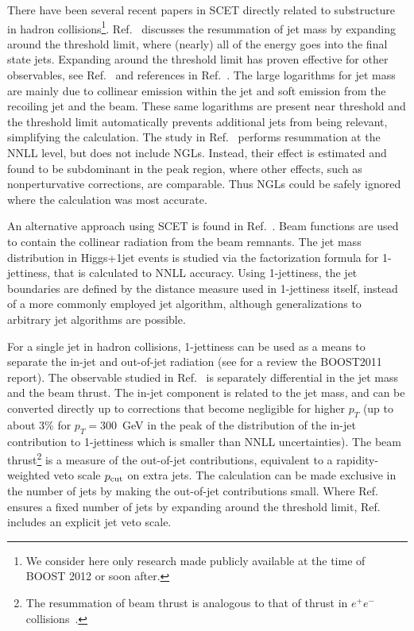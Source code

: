 There have been several recent papers in SCET directly related to 
substructure in hadron collisions\footnote{We consider here only 
research made publicly available at the time of BOOST 2012 or soon after.}. 
Ref.~\cite{Chien:2012ur} discusses the resummation of jet mass by expanding
around the threshold limit, where (nearly) all of the energy goes into the
final state jets. Expanding around the threshold limit has proven effective 
for other observables, see Ref.~\cite{Laenen:1998qw} and references in
Ref.~\cite{Chien:2012ur}.
The large logarithms for jet mass are mainly due
to collinear emission within the jet and soft emission from the recoiling
jet and the beam. These same logarithms are present near threshold and the
threshold limit automatically prevents additional jets from being 
relevant, simplifying the calculation. The study in Ref.~\cite{Chien:2012ur}
performs resummation at the NNLL level, but does not include NGLs. Instead,
their effect is estimated and found to be subdominant in the peak region,
where other effects, such as nonperturvative corrections, are comparable. 
Thus NGLs could be safely ignored where the calculation was most accurate. 

An alternative approach using SCET is found in Ref.~\cite{Jouttenus:2013hs}. 
Beam functions are used to contain the collinear radiation from the beam
remnants. The jet mass distribution 
in Higgs+1jet events is studied via the factorization formula for 1-jettiness, 
that is calculated to NNLL accuracy. Using 1-jettiness, the jet boundaries 
are defined by the distance measure used in 1-jettiness itself, instead of 
a more commonly employed jet algorithm, although generalizations to
arbitrary jet algorithms are possible.

For a single jet in hadron collisions, 1-jettiness can be used as a 
means to separate the in-jet and out-of-jet radiation (see for 
a review the BOOST2011 report\cite{Altheimer:2012mn}). The observable 
studied in Ref.~\cite{Jouttenus:2013hs} is 
separately differential in the jet mass and the beam thrust. 
The in-jet component 
is related to the jet mass, and can be converted directly up to 
corrections that become negligible for higher $p_T$ (up to about 3\% 
for $p_T = 300$~GeV in the peak of the distribution of the in-jet 
contribution to 1-jettiness which is smaller than NNLL uncertainties). 
The beam thrust\footnote{The resummation of beam thrust
is analogous to that of thrust in $e^+e^-$ 
collisions~\cite{Berger:2010xi,Stewart:2010pd,Stewart:2009yx}.} 
is a measure of the out-of-jet contributions, equivalent to a
rapidity-weighted veto scale $p_{\rm cut}$ on extra jets. The calculation
can be made exclusive in the number of jets by making the out-of-jet 
contributions small. 
Where Ref.~\cite{Chien:2012ur} ensures a fixed number
of jets by expanding around the threshold limit, Ref.~\cite{Jouttenus:2013hs}
includes an explicit jet veto scale.


